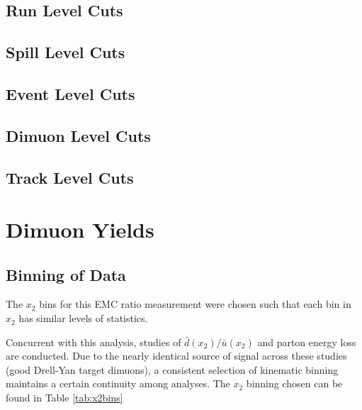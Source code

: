 \subsection{Run Level Cuts}


\subsection{Spill Level Cuts}


\subsection{Event Level Cuts}


\subsection{Dimuon Level Cuts}


\subsection{Track Level Cuts}


\section{Dimuon Yields}

\subsection{Binning of Data}

The $x_2$ bins for this EMC ratio measurement were chosen such that each
bin in $x_2$ has similar levels of statistics. 

Concurrent with this analysis, studies of $\bar{d}(x_2)/\bar{u}(x_2)$ and 
parton energy loss are conducted. Due to the nearly
identical source of signal across these studies (good Drell-Yan target
dimuons), a consistent selection of kinematic binning maintains a 
certain continuity among analyses. The $x_2$ binning chosen can be found in Table \ref{tab:x2bins}

